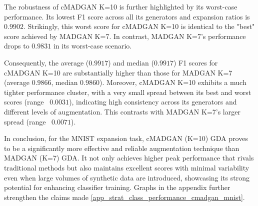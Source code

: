 The robustness of cMADGAN K=10 is further highlighted by its worst-case performance. Its lowest F1 score across all its generators and expansion ratios is $0.9902$. Strikingly, this worst score for cMADGAN K=10 is identical to the "best" score achieved by MADGAN K=7. In contrast, MADGAN K=7's performance drops to $0.9831$ in its worst-case scenario.

Consequently, the average ($0.9917$) and median ($0.9917$) F1 scores for cMADGAN K=10 are substantially higher than those for MADGAN K=7 (average $0.9866$, median $0.9860$). Moreover, cMADGAN K=10 exhibits a much tighter performance cluster, with a very small spread between its best and worst scores (range ~$0.0031$), indicating high consistency across its generators and different levels of augmentation. This contrasts with MADGAN K=7's larger spread (range ~$0.0071$).

In conclusion, for the MNIST expansion task, cMADGAN (K=10) GDA proves to be a significantly more effective and reliable augmentation technique than MADGAN (K=7) GDA. It not only achieves higher peak performance that rivals traditional methods but also maintains excellent scores with minimal variability even when large volumes of synthetic data are introduced, showcasing its strong potential for enhancing classifier training. Graphs in the appendix further strengthen the claims made \ref{app_strat_class_performance_cmadgan_mnist}.


